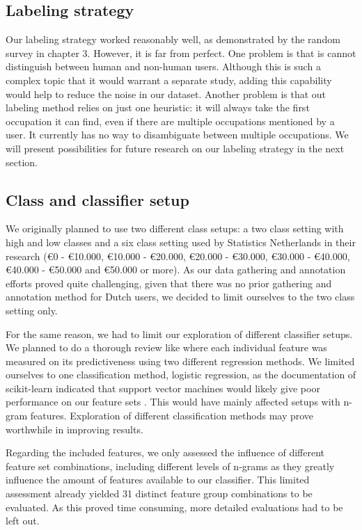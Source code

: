 \documentclass[
10pt, %
a4paper, %
oneside, %
headinclude,footinclude, %
] {book}%
\begin{document}
\subsection{Labeling strategy}
Our labeling strategy worked reasonably well, as demonstrated by the random survey in chapter 3. However, it is far from perfect. One problem is that is cannot distinguish between human and non-human users. Although this is such a complex topic that it would warrant a separate study, adding this capability would help to reduce the noise in our dataset. Another problem is that out labeling method relies on just one heuristic: it will always take the first occupation it can find, even if there are multiple occupations mentioned by a user. It currently has no way to disambiguate between multiple occupations. We will present possibilities for future research on our labeling strategy in the next section.

\subsection{Class and classifier setup}
We originally planned to use two different class setups: a two class setting with high and low classes and a six class setting used by Statistics Netherlands in their research (\euro 0 - \euro 10.000, \euro 10.000 - \euro 20.000, \euro 20.000 - \euro 30.000, \euro 30.000 - \euro 40.000, \euro 40.000 - \euro 50.000 and \euro 50.000 or more). As our data gathering and annotation efforts proved quite challenging, given that there was no prior gathering and annotation method for Dutch users, we decided to limit ourselves to the two class setting only.

For the same reason, we had to limit our exploration of different classifier setups. We planned to do a thorough review like\citet{flekova} where each individual feature was measured on its predictiveness using two different regression methods. We limited ourselves to one classification method, logistic regression, as the documentation of scikit-learn indicated that support vector machines would likely give poor performance on our feature sets \citep{svm}. This would have mainly affected setups with n-gram features. Exploration of different classification methods may prove worthwhile in improving results.

Regarding the included features, we only assessed the influence of different feature set combinations, including different levels of n-grams as they greatly influence the amount of features available to our classifier. This limited assessment already yielded 31 distinct feature group combinations to be evaluated. As this proved time consuming, more detailed evaluations had to be left out.
\end{document}
